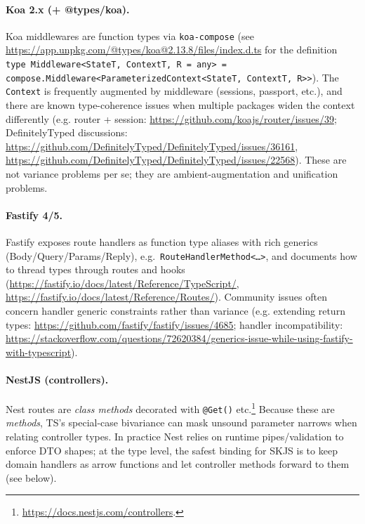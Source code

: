 \documentclass[11pt]{article}
\begin{document}
\paragraph{Koa 2.x (+ @types/koa).} Koa middlewares are function types via \texttt{koa-compose} (see \url{https://app.unpkg.com/@types/koa@2.13.8/files/index.d.ts} for the definition \texttt{type Middleware<StateT, ContextT, R = any> = compose.Middleware<ParameterizedContext<StateT, ContextT, R>>}). The \texttt{Context} is frequently augmented by middleware (sessions, passport, etc.), and there are known type-coherence issues when multiple packages widen the context differently (e.g. router + session: \url{https://github.com/koajs/router/issues/39}; DefinitelyTyped discussions: \url{https://github.com/DefinitelyTyped/DefinitelyTyped/issues/36161}, \url{https://github.com/DefinitelyTyped/DefinitelyTyped/issues/22568}). These are not variance problems per se; they are ambient-augmentation and unification problems.

\paragraph{Fastify 4/5.} Fastify exposes route handlers as function type aliases with rich generics (Body/Query/Params/Reply), e.g.\ \texttt{RouteHandlerMethod<\dots>}, and documents how to thread types through routes and hooks (\url{https://fastify.io/docs/latest/Reference/TypeScript/}, \url{https://fastify.io/docs/latest/Reference/Routes/}). Community issues often concern handler generic constraints rather than variance (e.g. extending return types: \url{https://github.com/fastify/fastify/issues/4685}; handler incompatibility: \url{https://stackoverflow.com/questions/72620384/generics-issue-while-using-fastify-with-typescript}).

\paragraph{NestJS (controllers).} Nest routes are \emph{class methods} decorated with \texttt{@Get()} etc.\footnote{\url{https://docs.nestjs.com/controllers}.} Because these are \emph{methods}, TS's special-case bivariance can mask unsound parameter narrows when relating controller types. In practice Nest relies on runtime pipes/validation to enforce DTO shapes; at the type level, the safest binding for SKJS is to keep domain handlers as arrow functions and let controller methods forward to them (see below).
\end{document}
